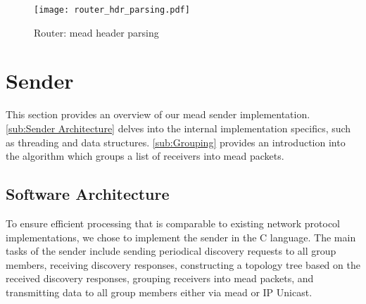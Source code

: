 %
\begin{figure}
    \begin{center}
        \texttt{[image: router\_hdr\_parsing.pdf]}
    \end{center}
    \caption[Router: MEADcast header parsing]{Router: \gls{mead} header parsing}
    \label{fig:router_hdr_parsing}
\end{figure}



\section{Sender} %
\label{sec:Sender}
This section provides an overview of our \gls{mead} sender implementation.
\autoref{sub:Sender Architecture} delves into the internal implementation
    specifics, such as threading and data structures.
\autoref{sub:Grouping} provides an introduction into the algorithm which
    groups a list of receivers into \gls{mead} packets.

\subsection{Software Architecture}
\label{sub:Sender Architecture}
To ensure efficient processing that is comparable to existing network
    protocol implementations, we chose to implement the sender in the C
    language.
The main tasks of the sender include sending periodical discovery requests to
    all group members, receiving discovery responses, constructing a topology
    tree based on the received discovery responses, grouping receivers into
    \gls{mead} packets, and transmitting data to all group members either via
    \gls{mead} or IP Unicast.

